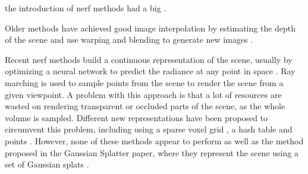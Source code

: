the introduction of \gls{nerf} methods had a big  \cite{mildenhallNeRFRepresentingScenes2020a}.




Older methods have achieved good image interpolation by estimating the depth of the scene and use warping and blending to generate new images \cite{zitnickHighqualityVideoView2004}.

Recent \gls{nerf} methods build a continuous representation of the scene, usually by optimizing a neural network to predict the radiance at any point in space \cite{mildenhallNeRFRepresentingScenes2020a}.
Ray marching is used to sample points from the scene to render the scene from a given viewpoint.
A problem with this approach is that a lot of resources are wasted on rendering transparent or occluded parts of the scene, as the whole volume is sampled.
Different new representations have been proposed to circumvent this problem, including using a sparse voxel grid \cite{yuPlenoxelsRadianceFields2021a}, a hash table \cite{mullerInstantNeuralGraphics2022} and points \cite{xuPointNeRFPointbasedNeural2023}.
However, none of these methods appear to perform as well as the method proposed in the Gaussian Splatter paper, where they represent the scene using a set of Gaussian splats \cite{kerbl3DGaussianSplatting2023}.


